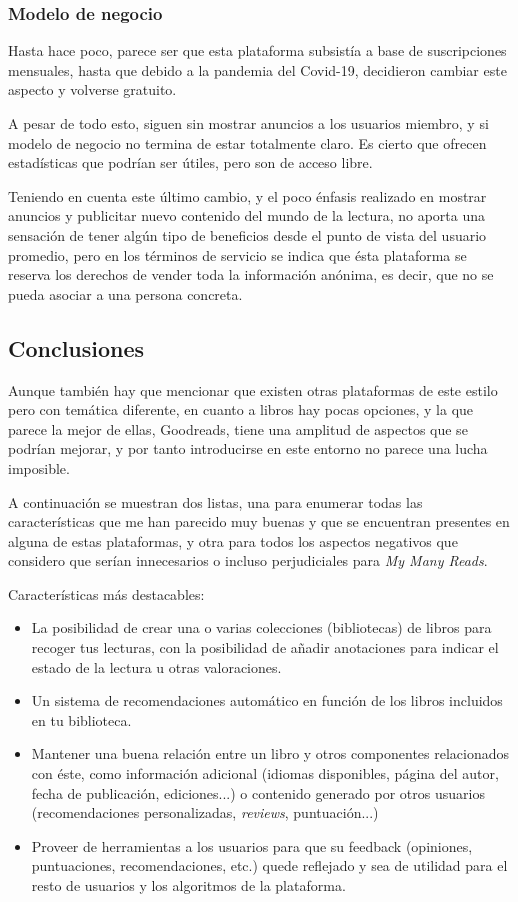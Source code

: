 \subsubsection{Modelo de negocio}

Hasta hace poco, parece ser que esta plataforma subsistía a base de suscripciones mensuales, hasta que debido a la pandemia del Covid-19, decidieron cambiar este aspecto y volverse gratuito.

A pesar de todo esto, siguen sin mostrar anuncios a los usuarios miembro, y si modelo de negocio no termina de estar totalmente claro. Es cierto que ofrecen estadísticas que podrían ser útiles, pero son de acceso libre. 

Teniendo en cuenta este último cambio, y el poco énfasis realizado en mostrar anuncios y publicitar nuevo contenido del mundo de la lectura, no aporta una sensación de tener algún tipo de beneficios desde el punto de vista del usuario promedio, pero en los términos de servicio se indica que ésta plataforma se reserva los derechos de vender toda la información anónima, es decir, que no se pueda asociar a una persona concreta.
 
\subsection{Conclusiones}

Aunque también hay que mencionar que existen otras plataformas de este estilo pero con temática diferente, en cuanto a libros hay pocas opciones, y la que parece la mejor de ellas, Goodreads, tiene una amplitud de aspectos que se podrían mejorar, y por tanto introducirse en este entorno no parece una lucha imposible.

A continuación se muestran dos listas, una para enumerar todas las características que me han parecido muy buenas y que se encuentran presentes en alguna de estas plataformas, y otra para todos los aspectos negativos que considero que serían innecesarios o incluso perjudiciales para \textit{My Many Reads}.

Características más destacables:

\begin{itemize}
\item La posibilidad de crear una o varias colecciones (bibliotecas) de libros para recoger tus lecturas, con la posibilidad de añadir anotaciones para indicar el estado de la lectura u otras valoraciones.
\item Un sistema de recomendaciones automático en función de los libros incluidos en tu biblioteca.
\item Mantener una buena relación entre un libro y otros componentes relacionados con éste, como información adicional (idiomas disponibles, página del autor, fecha de publicación, ediciones...) o contenido generado por otros usuarios (recomendaciones personalizadas, \textit{reviews}, puntuación...)
\item Proveer de herramientas a los usuarios para que su feedback (opiniones, puntuaciones, recomendaciones, etc.) quede reflejado y sea de utilidad para el resto de usuarios y los algoritmos de la plataforma.
\end{itemize}

